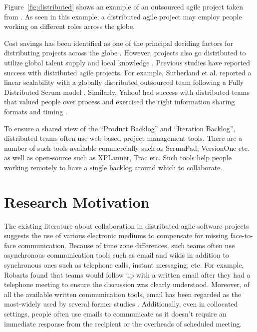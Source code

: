 Figure~\ref{fig:distributed} shows an example of an outsourced agile project taken from \cite{modified_agile}. As seen in this example, a distributed agile project may employ people working on different roles across the globe.

Cost savings has been identified as one of the principal deciding factors for distributing projects across the globe \cite{practical_considerations}. However, projects also go distributed to utilize global talent supply and local knowledge \cite{fully_distributed, modified_agile}. Previous studies have reported success with distributed agile projects. For example, Sutherland et al. reported a linear scalability with a globally distributed outsourced team following a Fully Distributed Scrum model \cite{fully_distributed}. Similarly, Yahoo! had success with distributed teams that valued people over process and exercised the right information sharing formats and timing \cite{yahoo}.

To ensure a shared view of the ``Product Backlog'' and ``Iteration Backlog'', distributed teams often use web-based project management tools. There are a number of such tools available commercially such as ScrumPad, VersionOne etc. as well as open-source \cite{scrum_pad, version_one} such as XPLanner, Trac etc.\cite{xplanner, trac} Such tools help people working remotely to have a single backlog around which to collaborate. 

\section{Research Motivation}
The existing literature about collaboration in distributed agile software projects suggests the use of various electronic mediums to compensate for missing face-to-face communication. Because of time zone differences, such teams often use asynchronous communication tools such as email and wikis in addition to synchronous ones such as telephone calls, instant messaging, etc. For example, Robarts \cite{practical_considerations} found that teams would follow up with a written email after they had a telephone meeting to ensure the discussion was clearly understood. Moreover, of all the available written communication tools, email has been regarded as the most-widely used by several former studies \cite{collaboration_in} \cite{on_coord}. Additionally, even in collocated settings, people often use emails to communicate as it doesn't require an immediate response from the recipient or the overheads of scheduled meeting.

